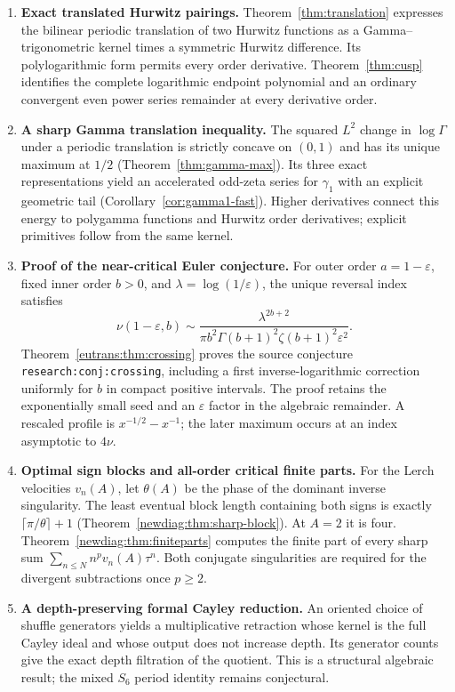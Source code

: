 \documentclass[11pt,a4paper]{article}
\numberwithin{equation}{section}
\theoremstyle{definition}
\theoremstyle{remark}
\begin{document}
\begin{enumerate}
\item \textbf{Exact translated Hurwitz pairings.}
Theorem~\ref{thm:translation} expresses the bilinear periodic translation
of two Hurwitz functions as a Gamma--trigonometric kernel times a
symmetric Hurwitz difference. Its polylogarithmic form permits every
order derivative. Theorem~\ref{thm:cusp} identifies the complete
logarithmic endpoint polynomial and an ordinary convergent even power
series remainder at every derivative order.

\item \textbf{A sharp Gamma translation inequality.}
The squared $L^2$ change in $\log\Gamma$ under a periodic translation is
strictly concave on $(0,1)$ and has its unique maximum at $1/2$
(Theorem~\ref{thm:gamma-max}). Its three exact representations yield
an accelerated odd-zeta series for $\gamma_1$ with an explicit geometric
tail (Corollary~\ref{cor:gamma1-fast}). Higher derivatives connect this
energy to polygamma functions and Hurwitz order derivatives; explicit
primitives follow from the same kernel.

\item \textbf{Proof of the near-critical Euler conjecture.}
For outer order $a=1-\varepsilon$, fixed inner order $b>0$, and
$\lambda=\log(1/\varepsilon)$, the unique reversal index satisfies
\[
 \nu(1-\varepsilon,b)\sim
 \frac{\lambda^{2b+2}}
 {\pi b^2\Gamma(b+1)^2\zeta(b+1)^2\varepsilon^2}.
\]
Theorem~\ref{eutrans:thm:crossing} proves the source conjecture
\texttt{research:conj:crossing}, including a first inverse-logarithmic
correction uniformly for $b$ in compact positive intervals. The proof
retains the exponentially small seed and an $\varepsilon$ factor in
the algebraic remainder. A rescaled profile is
$x^{-1/2}-x^{-1}$; the later maximum occurs at an index asymptotic
to $4\nu$.

\item \textbf{Optimal sign blocks and all-order critical finite parts.}
For the Lerch velocities $v_n(A)$, let $\theta(A)$ be the phase of
the dominant inverse singularity. The least eventual block length
containing both signs is exactly $\lceil\pi/\theta\rceil+1$
(Theorem~\ref{newdiag:thm:sharp-block}). At $A=2$ it is four.
Theorem~\ref{newdiag:thm:finiteparts} computes the finite part of every
sharp sum $\sum_{n\leq N}n^pv_n(A)\tau^n$. Both conjugate singularities
are required for the divergent subtractions once $p\geq2$.

\item \textbf{A depth-preserving formal Cayley reduction.}
An oriented choice of shuffle generators yields a multiplicative
retraction whose kernel is the full Cayley ideal and whose output
does not increase depth. Its generator counts give the exact depth
filtration of the quotient. This is a structural algebraic result;
the mixed $S_6$ period identity remains conjectural.
\end{enumerate}
\end{document}

